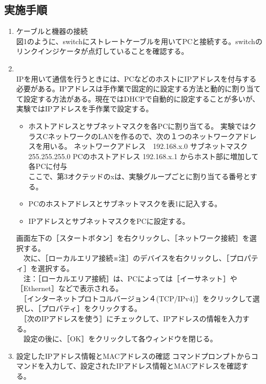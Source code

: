 \documentclass[10pt]{article}
\begin{document}
\subsection{実施手順}
\begin{enumerate}
    \item ケーブルと機器の接続 \\
            図1のように、switchにストレートケーブルを用いてPCと接続する。switchのリンクインジケータが点灯していることを確認する。 
    \item \\
        IPを用いて通信を行うときには、PCなどのホストにIPアドレスを付与する必要がある。IPアドレスは手作業で固定的に設定する方法と動的に割り当てて設定する方法がある。現在ではDHCPで自動的に設定することが多いが、実験ではIPアドレスを手作業で設定する。
        \begin{itemize}
            \item ホストアドレスとサブネットマスクを各PCに割り当てる。
                実験ではクラスCネットワークのLANを作るので、次の１つのネットワークアドレスを用いる。 ネットワークアドレス　192.168.x.0 サブネットマスク 255.255.255.0 PCのホストアドレス 192.168.x.1 からホスト部に増加して各PCに付与 \\ \text{*}ここで、第3オクテッドのxは、実験グループごとに割り当てる番号とする。
            \item PCのホストアドレスとサブネットマスクを表1に記入する。
            \item IPアドレスとサブネットマスクをPCに設定する。
        \end{itemize}
        画面左下の［スタートボタン］を右クリックし、［ネットワーク接続］を選択する。\\ 　次に、［ローカルエリア接続※注］のデバイスを右クリックし、［プロパティ］を選択する。\\ 　\text{*}注：［ローカルエリア接続］は、PCによっては［イーサネット］や［Ethernet］などで表示される。\\ 　［インターネットプロトコルバージョン４(TCP/IPv4)］をクリックして選択し、［プロパティ］をクリックする。\\ 　［次のIPアドレスを使う］にチェックして、IPアドレスの情報を入力する。\\ 　設定の後に、［OK］をクリックして各ウィンドウを閉じる。 \\
    \item 設定したIPアドレス情報とMACアドレスの確認
            コマンドプロンプトからコマンドを入力して、設定されたIPアドレス情報とMACアドレスを確認する。
            \begin{itemize}

\end{itemize}
\end{enumerate}
\end{document}
